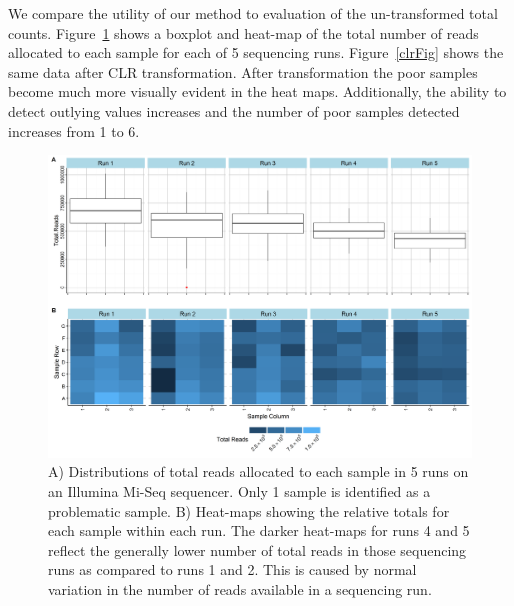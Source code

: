 \documentclass{article}\usepackage[]{graphicx}\usepackage[]{color}
\theoremstyle{definition}
\begin{document}
We compare the utility of our method to evaluation of the un-transformed total counts.  Figure~\ref{totalFig} shows a boxplot and heat-map of the total number of reads allocated to each sample for each of 5 sequencing runs.  Figure~\ref{clrFig} shows the same data after CLR transformation.  After transformation the poor samples become much more visually evident in the heat maps.  Additionally, the ability to detect outlying values increases and the number of poor samples detected increases from 1 to 6.  \\

\begin{figure}
\includegraphics[scale=.5]{./Figures/IO_Repro_Combined_RawTotals}
\caption{A) Distributions of total reads allocated to each sample in 5 runs on an Illumina Mi-Seq sequencer. Only 1 sample is identified as a problematic sample. B) Heat-maps showing the relative totals for each sample within each run.  The darker heat-maps for runs 4 and 5 reflect the generally lower number of total reads in those sequencing runs as compared to runs 1 and 2.  This is caused by normal variation in the number of reads available in a sequencing run.}
\label{totalFig}
\end{figure}
 
\end{document}
